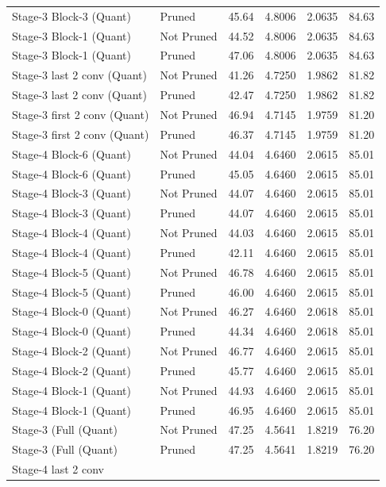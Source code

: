 \begin{table}
\begin{tabular}{llcccc}
Stage-3 Block-3
(Quant) & Pruned & 45.64 & 4.8006 & 2.0635 & 84.63 \\
Stage-3 Block-1
(Quant) & Not Pruned & 44.52 & 4.8006 & 2.0635 & 84.63 \\
Stage-3 Block-1
(Quant) & Pruned & 47.06 & 4.8006 & 2.0635 & 84.63 \\
Stage-3 last 2 conv
(Quant) & Not Pruned & 41.26 & 4.7250 & 1.9862 & 81.82 \\
Stage-3 last 2 conv
(Quant) & Pruned & 42.47 & 4.7250 & 1.9862 & 81.82 \\
Stage-3 first 2 conv
(Quant) & Not Pruned & 46.94 & 4.7145 & 1.9759 & 81.20 \\
Stage-3 first 2 conv
(Quant) & Pruned & 46.37 & 4.7145 & 1.9759 & 81.20 \\
Stage-4 Block-6
(Quant) & Not Pruned & 44.04 & 4.6460 & 2.0615 & 85.01 \\
Stage-4 Block-6
(Quant) & Pruned & 45.05 & 4.6460 & 2.0615 & 85.01 \\
Stage-4 Block-3
(Quant) & Not Pruned & 44.07 & 4.6460 & 2.0615 & 85.01 \\
Stage-4 Block-3
(Quant) & Pruned & 44.07 & 4.6460 & 2.0615 & 85.01 \\
Stage-4 Block-4
(Quant) & Not Pruned & 44.03 & 4.6460 & 2.0615 & 85.01 \\
Stage-4 Block-4
(Quant) & Pruned & 42.11 & 4.6460 & 2.0615 & 85.01 \\
Stage-4 Block-5
(Quant) & Not Pruned & 46.78 & 4.6460 & 2.0615 & 85.01 \\
Stage-4 Block-5
(Quant) & Pruned & 46.00 & 4.6460 & 2.0615 & 85.01 \\
Stage-4 Block-0
(Quant) & Not Pruned & 46.27 & 4.6460 & 2.0618 & 85.01 \\
Stage-4 Block-0
(Quant) & Pruned & 44.34 & 4.6460 & 2.0618 & 85.01 \\
Stage-4 Block-2
(Quant) & Not Pruned & 46.77 & 4.6460 & 2.0615 & 85.01 \\
Stage-4 Block-2
(Quant) & Pruned & 45.77 & 4.6460 & 2.0615 & 85.01 \\
Stage-4 Block-1
(Quant) & Not Pruned & 44.93 & 4.6460 & 2.0615 & 85.01 \\
Stage-4 Block-1
(Quant) & Pruned & 46.95 & 4.6460 & 2.0615 & 85.01 \\
Stage-3 (Full
(Quant) & Not Pruned & 47.25 & 4.5641 & 1.8219 & 76.20 \\
Stage-3 (Full
(Quant) & Pruned & 47.25 & 4.5641 & 1.8219 & 76.20 \\
Stage-4 last 2 conv

\end{tabular}
\end{table}

